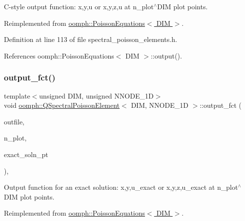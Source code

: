 C-\/style output function\+: x,y,u or x,y,z,u at n\+\_\+plot$^\wedge$\+D\+IM plot points. 



Reimplemented from \hyperlink{classoomph_1_1PoissonEquations_abc30eee5faaa50a65b272012d17ba604}{oomph\+::\+Poisson\+Equations$<$ D\+I\+M $>$}.



Definition at line 113 of file spectral\+\_\+poisson\+\_\+elements.\+h.



References oomph\+::\+Poisson\+Equations$<$ D\+I\+M $>$\+::output().

\mbox{\label{classoomph_1_1QSpectralPoissonElement_a112f8c43964b2514296974a90dc4b587}} 
\subsubsection{\texorpdfstring{output\+\_\+fct()}{output\_fct()}\hspace{0.1cm}{\footnotesize\ttfamily [1/2]}}
{\footnotesize\ttfamily template$<$unsigned D\+IM, unsigned N\+N\+O\+D\+E\+\_\+1D$>$ \\
void \hyperlink{classoomph_1_1QSpectralPoissonElement}{oomph\+::\+Q\+Spectral\+Poisson\+Element}$<$ D\+IM, N\+N\+O\+D\+E\+\_\+1D $>$\+::output\+\_\+fct (\begin{DoxyParamCaption}\item[{std\+::ostream \&}]{outfile,  }\item[{const unsigned \&}]{n\+\_\+plot,  }\item[{\hyperlink{classoomph_1_1FiniteElement_a690fd33af26cc3e84f39bba6d5a85202}{Finite\+Element\+::\+Steady\+Exact\+Solution\+Fct\+Pt}}]{exact\+\_\+soln\+\_\+pt }\end{DoxyParamCaption})\hspace{0.3cm}{\ttfamily [inline]}, {\ttfamily [virtual]}}



Output function for an exact solution\+: x,y,u\+\_\+exact or x,y,z,u\+\_\+exact at n\+\_\+plot$^\wedge$\+D\+IM plot points. 



Reimplemented from \hyperlink{classoomph_1_1PoissonEquations_ad6c637c8a5221313c2220e8e8c27ec42}{oomph\+::\+Poisson\+Equations$<$ D\+I\+M $>$}.



